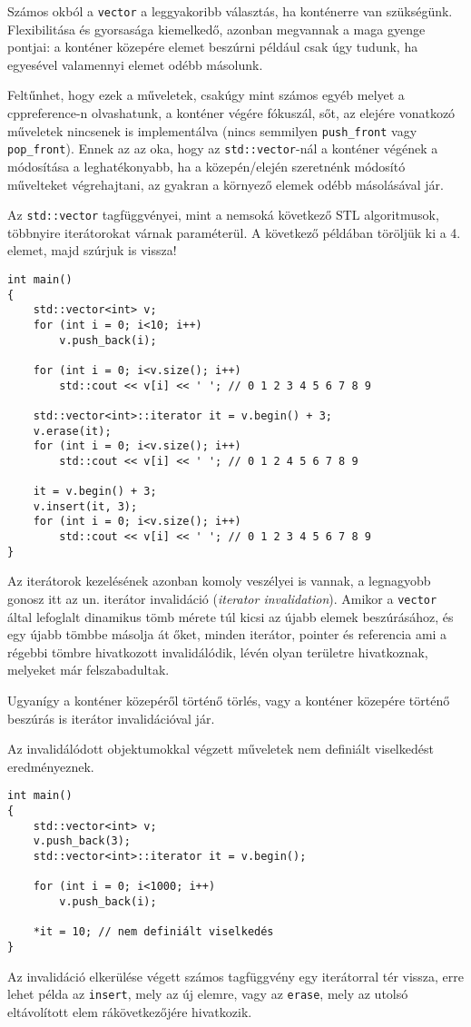 \documentclass[a4paper,11.5pt,table]{article}
\begin{document}
	\begin{note}
		Számos okból a \texttt{vector} a leggyakoribb választás, ha konténerre van szükségünk. Flexibilitása és gyorsasága kiemelkedő, azonban megvannak a maga gyenge pontjai: a konténer közepére elemet beszúrni például csak úgy tudunk, ha egyesével valamennyi elemet odébb másolunk.
	\end{note}
	
	Feltűnhet, hogy ezek a műveletek, csakúgy mint számos egyéb melyet a cppreference-n olvashatunk, a konténer végére fókuszál, sőt, az elejére vonatkozó műveletek nincsenek is implementálva (nincs semmilyen \texttt{push\_front} vagy \texttt{pop\_front}). Ennek az az oka, hogy az \texttt{std::vector}-nál a konténer végének a módosítása a leghatékonyabb, ha a közepén/elején szeretnénk módosító művelteket végrehajtani, az gyakran a környező elemek odébb másolásával jár.

	\medskip
	Az \texttt{std::vector} tagfüggvényei, mint a nemsoká következő STL algoritmusok, többnyire iterátorokat várnak paraméterül. A következő példában töröljük ki a 4. elemet, majd szúrjuk is vissza!
	\begin{lstlisting}
int main()
{
	std::vector<int> v;
	for (int i = 0; i<10; i++)
		v.push_back(i);
		
	for (int i = 0; i<v.size(); i++)
		std::cout << v[i] << ' '; // 0 1 2 3 4 5 6 7 8 9
		
	std::vector<int>::iterator it = v.begin() + 3;
	v.erase(it);
	for (int i = 0; i<v.size(); i++)
		std::cout << v[i] << ' '; // 0 1 2 4 5 6 7 8 9
	
	it = v.begin() + 3;
	v.insert(it, 3);
	for (int i = 0; i<v.size(); i++)
		std::cout << v[i] << ' '; // 0 1 2 3 4 5 6 7 8 9
}
	\end{lstlisting}
	Az iterátorok kezelésének azonban komoly veszélyei is vannak, a legnagyobb gonosz itt az un. iterátor invalidáció (\textit{iterator invalidation}). Amikor a \texttt{vector} által lefoglalt dinamikus tömb mérete túl kicsi az újabb elemek beszúrásához, és egy újabb tömbbe másolja át őket, minden iterátor, pointer és referencia ami a régebbi tömbre hivatkozott invalidálódik, lévén olyan területre hivatkoznak, melyeket már felszabadultak. 
	\smallskip
	
	Ugyanígy a konténer közepéről történő törlés, vagy a konténer közepére történő beszúrás is iterátor invalidációval jár.
	\smallskip
	
	Az invalidálódott objektumokkal végzett műveletek nem definiált viselkedést eredményeznek.
	\begin{lstlisting}
int main()
{
	std::vector<int> v;
	v.push_back(3);
	std::vector<int>::iterator it = v.begin();
	
	for (int i = 0; i<1000; i++)
		v.push_back(i);
		
	*it = 10; // nem definiált viselkedés
}
	\end{lstlisting}
	Az invalidáció elkerülése végett számos tagfüggvény egy iterátorral tér vissza, erre lehet példa az \texttt{insert}, mely az új elemre, vagy az \texttt{erase}, mely az utolsó eltávolított elem rákövetkezőjére hivatkozik.
	
\end{document}
